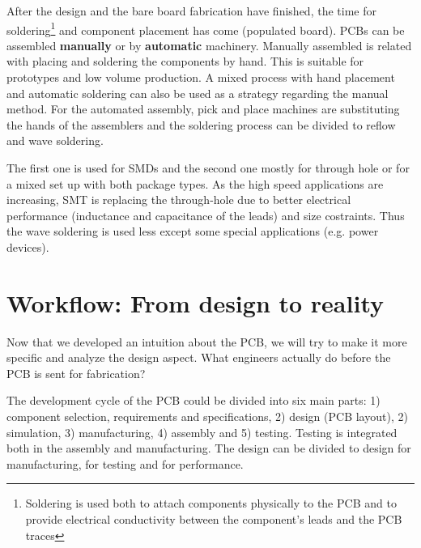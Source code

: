 \documentclass[final]{cubedoc}
\begin{document}
	After the design and the bare board fabrication have finished, the time for soldering\footnote{Soldering is used both to attach components physically to the PCB and to provide electrical conductivity between the component’s leads and the PCB traces} and component placement has come (populated board). PCBs can be assembled \textbf{manually} or by \textbf{automatic} machinery. Manually assembled is related with placing and soldering the components by hand. This is suitable for prototypes and low volume production. A mixed process with hand placement and automatic soldering can also be used as a strategy regarding the manual method. For the automated assembly, pick and place machines are substituting the hands of the assemblers and the soldering process can be divided to reflow and wave soldering. 
	
	
	The first one is used for SMDs and the second one mostly for through hole or for a mixed set up with both package types. 
	As the high speed applications are increasing, SMT is replacing the through-hole due to better electrical performance (inductance and capacitance of the leads) and size costraints. Thus the wave soldering is used less except some special applications (e.g. power devices).
	
	
	
	
	
	
	
	\section{Workflow: From design to reality} 
	
	Now that we developed an intuition about the PCB, we will try to make it more specific and analyze the design aspect. What engineers actually do before the PCB is sent for fabrication?
	
	The development cycle of the PCB could be divided into six main parts: 1) component selection, requirements and specifications, 2) design (PCB layout), 2) simulation, 3) manufacturing, 4) assembly and 5) testing. Testing is integrated both in the assembly and manufacturing.
	The design can be divided to design for manufacturing, for testing and for performance.  
	
\end{document}
